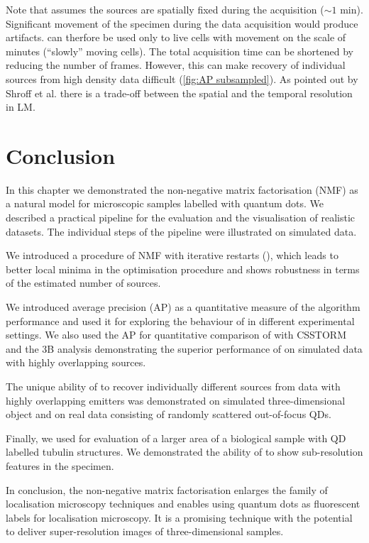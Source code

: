 Note that \inmf{} assumes the sources are spatially fixed during the acquisition ($\sim 1$ min). Significant movement of the specimen during the data acquisition would produce artifacts. \inmf{} can therfore be used only to live cells with movement on the scale of minutes (``slowly'' moving cells). The total acquisition time can be shortened by reducing the number of frames. However, this can make recovery of individual sources from high density data difficult (\autoref{fig:AP subsampled}). As pointed out by Shroff et al. \cite{Shroff2008} there is a trade-off between the spatial and the temporal resolution in LM.
\afterpage{\clearpage} 

\section{Conclusion\label{sec:Conclusion}}

In this chapter we demonstrated the non-negative matrix factorisation (NMF) as a natural model for microscopic samples labelled with quantum dots. We described a practical pipeline for the evaluation and the visualisation of realistic datasets. The individual steps of the pipeline were illustrated on simulated data.

We introduced a procedure of NMF with iterative restarts (\inmf{}), which leads to better local minima in the optimisation procedure and shows robustness in terms of the estimated number of sources. 

We introduced average precision (AP) as a quantitative measure  of the algorithm performance and used it for exploring the behaviour of \inmf{} in different experimental settings. We also used the AP for quantitative comparison of \inmf{} with CSSTORM and the 3B analysis demonstrating the superior performance of \inmf{} on simulated data with highly overlapping sources. 

The unique ability of \inmf{} to recover individually different sources from data with highly overlapping emitters was demonstrated on simulated three-dimensional object and on real data consisting of randomly scattered out-of-focus QDs. 

Finally, we used \inmf{} for evaluation of a larger area of a biological sample with QD labelled tubulin structures. We demonstrated the ability of  \inmf{} to show sub-resolution features in the specimen.

In conclusion, the non-negative matrix factorisation enlarges the family of localisation microscopy techniques and enables using quantum dots as fluorescent labels for localisation microscopy. It is a promising technique with the potential to deliver super-resolution images of three-dimensional samples. 

